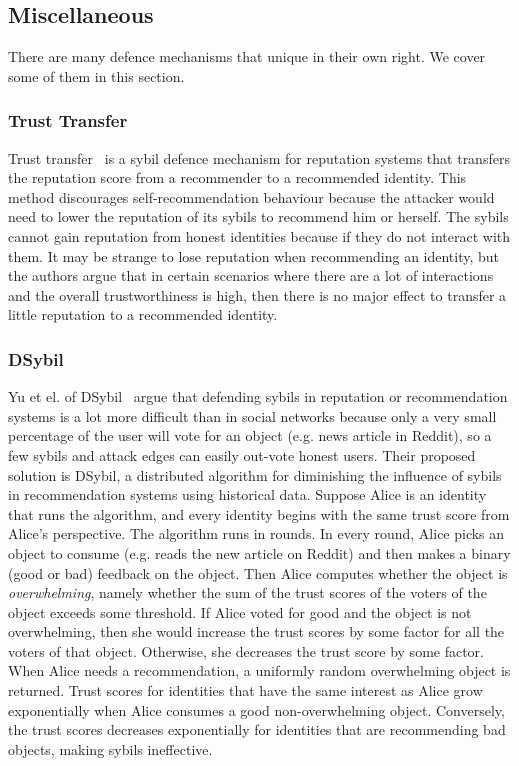 
\subsection{Miscellaneous}
There are many defence mechanisms that unique in their own right. We cover some
of them in this section.

\subsubsection{Trust Transfer}
Trust transfer~\cite{seigneur2005trust} is a sybil defence mechanism for
reputation systems that transfers the reputation score from a recommender to a
recommended identity. This method discourages self-recommendation behaviour
because the attacker would need to lower the reputation of its sybils to
recommend him or herself. The sybils cannot gain reputation from honest
identities because if they do not interact with them. It may be strange to lose
reputation when recommending an identity, but the authors argue that in certain
scenarios where there are a lot of interactions and the overall trustworthiness
is high, then there is no major effect to transfer a little reputation to
a recommended identity.

\subsubsection{DSybil}
Yu et el. of DSybil~\cite{yu2009dsybil} argue that defending sybils in reputation
or recommendation systems is a lot more difficult than in social networks
because only a very small percentage of the user will vote for an object (e.g.
news article in Reddit), so a few sybils and attack edges can easily out-vote
honest users. Their proposed solution is DSybil, a distributed algorithm for
diminishing the influence of sybils in recommendation systems using historical
data. Suppose Alice is an identity that runs the algorithm, and every identity
begins with the same trust score from Alice's perspective. The algorithm runs in
rounds. In every round, Alice picks an object to consume (e.g. reads the new
article on Reddit) and then makes a binary (good or bad) feedback on the object.
Then Alice computes whether the object is \emph{overwhelming}, namely whether
the sum of the trust scores of the voters of the object exceeds some threshold.
If Alice voted for good and the object is not overwhelming, then she would
increase the trust scores by some factor for all the voters of that object.
Otherwise, she decreases the trust score by some factor. When Alice needs a
recommendation, a uniformly random overwhelming object is returned. Trust scores
for identities that have the same interest as Alice grow exponentially when
Alice consumes a good non-overwhelming object. Conversely, the trust scores
decreases exponentially for identities that are recommending bad objects, making
sybils ineffective.

